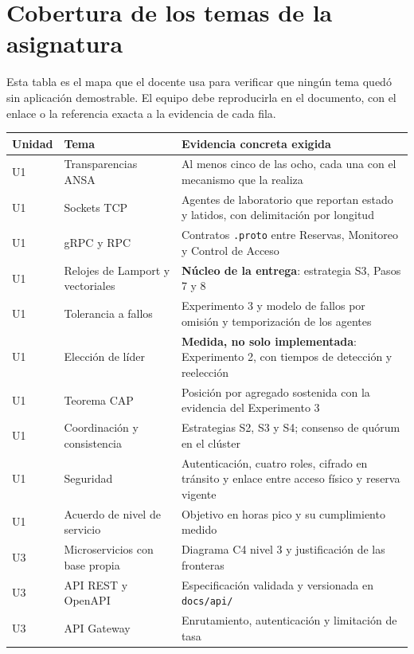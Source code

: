 \documentclass[11pt,a4paper]{article}
\begin{document}
	\section{Cobertura de los temas de la asignatura}
	
	Esta tabla es el mapa que el docente usa para verificar que ningún tema quedó sin aplicación demostrable. El equipo debe reproducirla en el documento, con el enlace o la referencia exacta a la evidencia de cada fila.
	
	\begin{center}
		\footnotesize
		\begin{longtable}{@{}p{1.1cm}p{4.9cm}p{8.9cm}@{}}
			\toprule
			\textbf{Unidad} & \textbf{Tema} & \textbf{Evidencia concreta exigida} \\
			\midrule
			\endhead
			U1 & Transparencias ANSA & Al menos cinco de las ocho, cada una con el mecanismo que la realiza \\
			U1 & Sockets TCP & Agentes de laboratorio que reportan estado y latidos, con delimitación por longitud \\
			U1 & gRPC y RPC & Contratos \texttt{.proto} entre Reservas, Monitoreo y Control de Acceso \\
			U1 & Relojes de Lamport y vectoriales & \textbf{Núcleo de la entrega}: estrategia S3, Pasos 7 y 8 \\
			U1 & Tolerancia a fallos & Experimento 3 y modelo de fallos por omisión y temporización de los agentes \\
			U1 & Elección de líder & \textbf{Medida, no solo implementada}: Experimento 2, con tiempos de detección y reelección \\
			U1 & Teorema CAP & Posición por agregado sostenida con la evidencia del Experimento 3 \\
			U1 & Coordinación y consistencia & Estrategias S2, S3 y S4; consenso de quórum en el clúster \\
			U1 & Seguridad & Autenticación, cuatro roles, cifrado en tránsito y enlace entre acceso físico y reserva vigente \\
			U1 & Acuerdo de nivel de servicio & Objetivo en horas pico y su cumplimiento medido \\
			U3 & Microservicios con base propia & Diagrama C4 nivel 3 y justificación de las fronteras \\
			U3 & API REST y OpenAPI & Especificación validada y versionada en \texttt{docs/api/} \\
			U3 & API Gateway & Enrutamiento, autenticación y limitación de tasa \\

\end{longtable}
\end{center}
\end{document}
